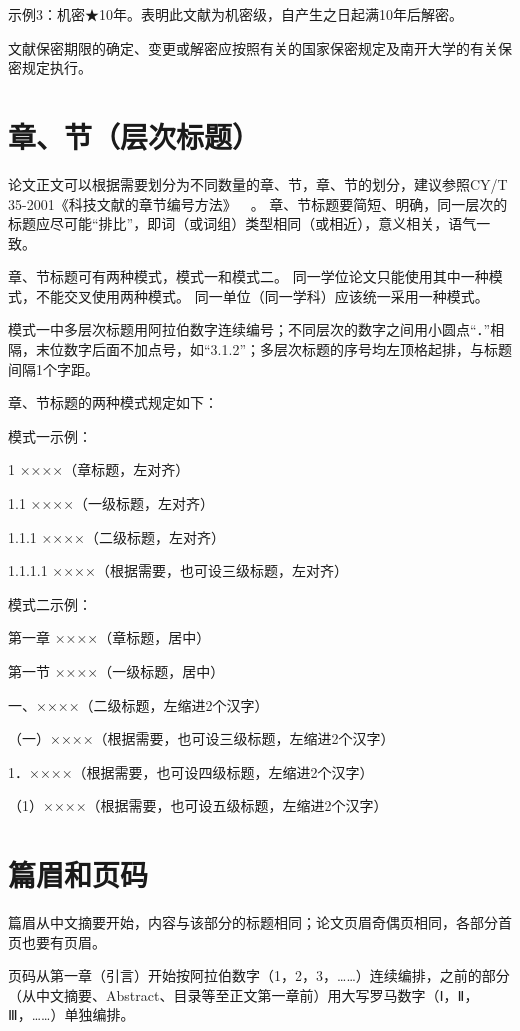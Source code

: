 示例3：机密{\segoeui{}★}10年。表明此文献为机密级，自产生之日起满10年后解密。

文献保密期限的确定、变更或解密应按照有关的国家保密规定及南开大学的有关保密规定执行。

\section{章、节（层次标题）}

论文正文可以根据需要划分为不同数量的章、节，章、节的划分，建议参照CY/T 35-2001《科技文献的章节编号方法》~~\cite{REF00000004}。
章、节标题要简短、明确，同一层次的标题应尽可能“排比”，即词（或词组）类型相同（或相近），意义相关，语气一致。

章、节标题可有两种模式，模式一和模式二。
同一学位论文只能使用其中一种模式，不能交叉使用两种模式。
同一单位（同一学科）应该统一采用一种模式。

模式一中多层次标题用阿拉伯数字连续编号；不同层次的数字之间用小圆点“．”相隔，末位数字后面不加点号，如“3.1.2”；多层次标题的序号均左顶格起排，与标题间隔1个字距。

章、节标题的两种模式规定如下：

模式一示例：

1 ××××（章标题，左对齐）

1.1 ××××（一级标题，左对齐）

1.1.1 ××××（二级标题，左对齐）

1.1.1.1 ××××（根据需要，也可设三级标题，左对齐）

模式二示例：

第一章 ××××（章标题，居中）

第一节 ××××（一级标题，居中）

一、××××（二级标题，左缩进2个汉字）

（一）××××（根据需要，也可设三级标题，左缩进2个汉字）

1．××××（根据需要，也可设四级标题，左缩进2个汉字）

（1）××××（根据需要，也可设五级标题，左缩进2个汉字）

\section{篇眉和页码}

篇眉从中文摘要开始，内容与该部分的标题相同；论文页眉奇偶页相同，各部分首页也要有页眉。

页码从第一章（引言）开始按阿拉伯数字（1，2，3，……）连续编排，之前的部分（从中文摘要、Abstract、目录等至正文第一章前）用大写罗马数字（Ⅰ，Ⅱ，Ⅲ，……）单独编排。

